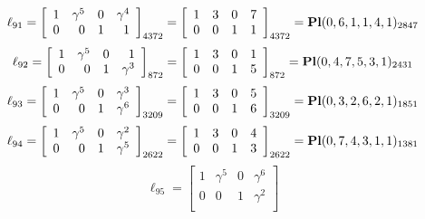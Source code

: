 \documentclass{article}
\begin{document}
{$$
\ell_{91} = 
\left[
\begin{array}{*{4}{r}}
1 & \gamma^{5} & 0 & \gamma^{4}\\
0 & 0 & 1 & 1\\
\end{array}
\right]
_{4372}
=
\left[
\begin{array}{*{4}c}
1  & 3  & 0  & 7\\
0  & 0  & 1  & 1\\
\end{array}
\right]_{4372}
={\rm\bf Pl}(0,6,1,1,4,1 )_{2847}$$
$$
\ell_{92} = 
\left[
\begin{array}{*{4}{r}}
1 & \gamma^{5} & 0 & 1\\
0 & 0 & 1 & \gamma^{3}\\
\end{array}
\right]
_{872}
=
\left[
\begin{array}{*{4}c}
1  & 3  & 0  & 1\\
0  & 0  & 1  & 5\\
\end{array}
\right]_{872}
={\rm\bf Pl}(0,4,7,5,3,1 )_{2431}$$
$$
\ell_{93} = 
\left[
\begin{array}{*{4}{r}}
1 & \gamma^{5} & 0 & \gamma^{3}\\
0 & 0 & 1 & \gamma^{6}\\
\end{array}
\right]
_{3209}
=
\left[
\begin{array}{*{4}c}
1  & 3  & 0  & 5\\
0  & 0  & 1  & 6\\
\end{array}
\right]_{3209}
={\rm\bf Pl}(0,3,2,6,2,1 )_{1851}$$
$$
\ell_{94} = 
\left[
\begin{array}{*{4}{r}}
1 & \gamma^{5} & 0 & \gamma^{2}\\
0 & 0 & 1 & \gamma^{5}\\
\end{array}
\right]
_{2622}
=
\left[
\begin{array}{*{4}c}
1  & 3  & 0  & 4\\
0  & 0  & 1  & 3\\
\end{array}
\right]_{2622}
={\rm\bf Pl}(0,7,4,3,1,1 )_{1381}$$
$$
\ell_{95} = 
\left[
\begin{array}{*{4}{r}}
1 & \gamma^{5} & 0 & \gamma^{6}\\
0 & 0 & 1 & \gamma^{2}\\
\end{array}
\right]
$$}
\end{document}
